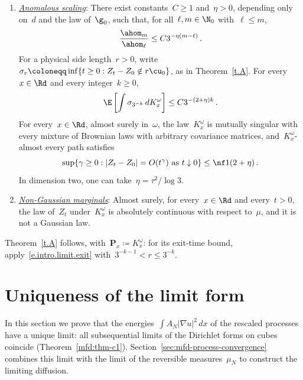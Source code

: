 \documentclass[11pt]{amsart}
\begin{document}
\begin{theorem}
\begin{enumerate}[label=(\roman*)]
\item \underline{\emph{Anomalous scaling}}: There exist constants~$C\geq1$ and~$\eta>0$, depending only on~$d$ and the law of~$\g_0$, such that, for all~$\ell,m\in\N_0$ with~$\ell\leq m$,
\begin{equation*}
	\frac{\ahom_m}{\ahom_\ell}\leq C3^{-\eta(m-\ell)}\,.
\end{equation*}
For a physical side length~$r>0$, write~$\sigma_r\coloneqq\inf\{t\geq0:Z_t-Z_0\notin r\cu_0\}$, as in Theorem~\ref{t.A}. For every~$x\in\Rd$ and every integer~$k\geq0$,
\begin{equation}
	\E\left[\int\sigma_{3^{-k}}\,dK_x^\omega\right]\leq C3^{-(2+\eta)k}\,.
	\label{e.intro.limit.exit}
\end{equation}
For every~$x\in\Rd$, almost surely in~$\omega$, the law~$K_x^\omega$ is mutually singular with every mixture of Brownian laws with arbitrary covariance matrices, and~$K_x^\omega$-almost every path satisfies
\begin{equation}
	\sup\{\gamma\geq0:|Z_t-Z_0|=O(t^\gamma)\text{ as }t\downarrow0\}
	\leq\nf1{(2+\eta)}\,.
	\label{e.intro.limit.Holder}
\end{equation}
In dimension two, one can take~$\eta=\tau^2/\log3$.

\item \underline{\emph{Non-Gaussian marginals}}: Almost surely, for every~$x\in\Rd$ and every~$t>0$, the law of~$Z_t$ under~$K_x^\omega$ is absolutely continuous with respect to~$\mu$, and it is not a Gaussian law.
\end{enumerate}
\end{theorem}

Theorem~\ref{t.A} follows, with~$\mathbf P_x\coloneqq K^\omega_x$: for its exit-time bound, apply~\eqref{e.intro.limit.exit} with~$3^{-k-1}<r\leq3^{-k}$.

\section{Uniqueness of the limit form}
\label{sec:mfd-uniqueness}

In this section we prove that the energies~$\int A_N|\nabla u|^2\,dx$ of the rescaled processes have a unique limit: all subsequential limits of the Dirichlet forms on cubes coincide (Theorem~\ref{mfd:thm-c1}). Section~\ref{sec:mfd-process-convergence} combines this limit with the limit of the reversible measures~$\mu_N$ to construct the limiting diffusion.

\smallskip
\end{document}
